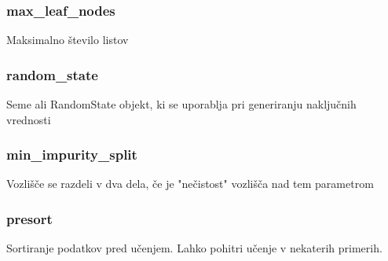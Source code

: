 \documentclass[a4paper,11pt]{article}
\begin{document}
\subsubsection{max_leaf_nodes}
Maksimalno število listov

\subsubsection{random_state}
Seme ali RandomState objekt, ki se uporablja pri generiranju naključnih vrednosti

\subsubsection{min_impurity_split}
Vozlišče se razdeli v dva dela, če je "nečistost" vozlišča nad tem parametrom

\subsubsection{presort}
Sortiranje podatkov pred učenjem. Lahko pohitri učenje v nekaterih primerih.
\end{document}
